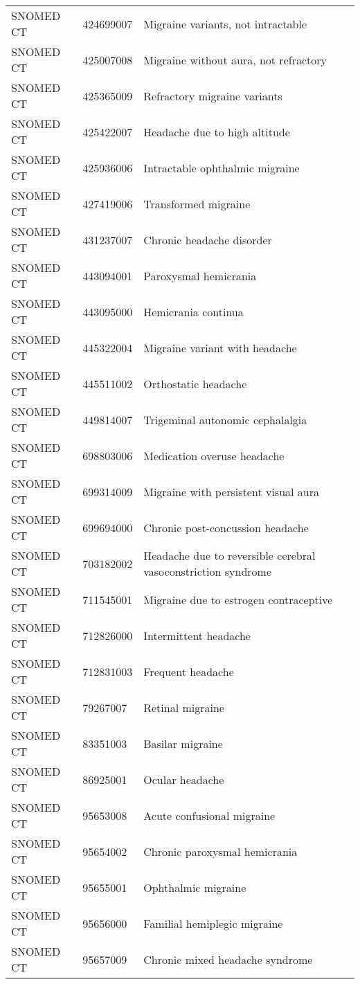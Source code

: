 \begin{longtable}{p{}p{}p{}}
  SNOMED CT & 424699007 & Migraine variants, not intractable \\ 
  SNOMED CT & 425007008 & Migraine without aura, not refractory \\ 
  SNOMED CT & 425365009 & Refractory migraine variants \\ 
  SNOMED CT & 425422007 & Headache due to high altitude \\ 
  SNOMED CT & 425936006 & Intractable ophthalmic migraine \\ 
  SNOMED CT & 427419006 & Transformed migraine \\ 
  SNOMED CT & 431237007 & Chronic headache disorder \\ 
  SNOMED CT & 443094001 & Paroxysmal hemicrania \\ 
  SNOMED CT & 443095000 & Hemicrania continua \\ 
  SNOMED CT & 445322004 & Migraine variant with headache \\ 
  SNOMED CT & 445511002 & Orthostatic headache \\ 
  SNOMED CT & 449814007 & Trigeminal autonomic cephalalgia \\ 
  SNOMED CT & 698803006 & Medication overuse headache \\ 
  SNOMED CT & 699314009 & Migraine with persistent visual aura \\ 
  SNOMED CT & 699694000 & Chronic post-concussion headache \\ 
  SNOMED CT & 703182002 & Headache due to reversible cerebral vasoconstriction syndrome \\ 
  SNOMED CT & 711545001 & Migraine due to estrogen contraceptive \\ 
  SNOMED CT & 712826000 & Intermittent headache \\ 
  SNOMED CT & 712831003 & Frequent headache \\ 
  SNOMED CT & 79267007 & Retinal migraine \\ 
  SNOMED CT & 83351003 & Basilar migraine \\ 
  SNOMED CT & 86925001 & Ocular headache \\ 
  SNOMED CT & 95653008 & Acute confusional migraine \\ 
  SNOMED CT & 95654002 & Chronic paroxysmal hemicrania \\ 
  SNOMED CT & 95655001 & Ophthalmic migraine \\ 
  SNOMED CT & 95656000 & Familial hemiplegic migraine \\ 
  SNOMED CT & 95657009 & Chronic mixed headache syndrome \\ 

\end{longtable}
